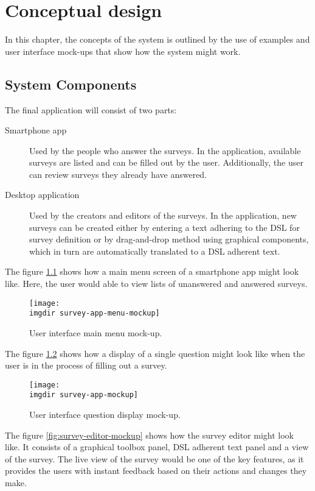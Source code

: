 \chapter{Conceptual design}
\label{chap:examples}
In this chapter, the concepts of the system is outlined by the use of examples and user interface mock-ups that show how the system might work.

\section{System Components}
\label{sec:systemcomponents}
The final application will consist of two parts: 

\begin{description}
\item[Smartphone app] Used by the people who answer the surveys. In the application, available surveys are listed and can be filled out by the user. Additionally, the user can review surveys they already have answered.
\item[Desktop application] Used by the creators and editors of the surveys. In the application, new surveys can be created either by entering a text adhering to the DSL for survey definition or by drag-and-drop method using graphical components, which in turn are automatically translated to a DSL adherent text.
\end{description}

The figure \ref{fig:survey-app-menu-mockup} shows how a main menu screen of a smartphone app might look like. Here, the user would able to view lists of unanswered and answered surveys.

\begin{figure}[!ht]
  \centering
  \texttt{[image: \\imgdir survey-app-menu-mockup]}
  \caption{User interface main menu mock-up.}
  \label{fig:survey-app-menu-mockup}
\end{figure}


The figure \ref{fig:survey-app-mockup} shows how a display of a single question might look like when the user is in the process of filling out a survey.

\begin{figure}[!ht]
  \centering
  \texttt{[image: \\imgdir survey-app-mockup]}
  \caption{User interface question display mock-up.}
  \label{fig:survey-app-mockup}
\end{figure}

The figure \ref{fig:survey-editor-mockup} shows how the survey editor might look like. It consists of a graphical toolbox panel, DSL adherent text panel and a view of the survey. The live view of the survey would be one of the key features, as it provides the users with instant feedback based on their actions and changes they make.

